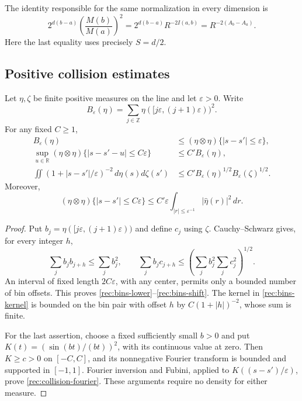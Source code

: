 The identity responsible for the same normalization in every dimension is
\begin{equation}\label{rec:normalization}
 2^{d(b-a)}\left(\frac{M(b)}{M(a)}\right)^2
 =2^{d(b-a)}R^{-2I(a,b)}
 =R^{-2(A_b-A_a)}.
\end{equation}
Here the last equality uses precisely $S=d/2$.

\subsection{Positive collision estimates}

\begin{lemma}\label{rec:binning}
Let \(\eta,\zeta\) be finite positive measures on the line and let
\(\varepsilon>0\).  Write
\[
 B_\varepsilon(\eta)
 =\sum_{j\in\mathbb Z}\eta([j\varepsilon,(j+1)\varepsilon))^2.
\]
For any fixed \(C\ge1\),
\begin{align}
 B_\varepsilon(\eta)
 &\le(\eta\otimes\eta)\{|s-s'|\le\varepsilon\},
 \label{rec:bins-lower}\\
 \sup_{u\in\mathbb R}
 (\eta\otimes\eta)\{|s-s'-u|\le C\varepsilon\}
 &\le C' B_\varepsilon(\eta),
 \label{rec:bins-shift}\\
 \iint(1+|s-s'|/\varepsilon)^{-2}\,d\eta(s)d\zeta(s')
 &\le C' B_\varepsilon(\eta)^{1/2}
                    B_\varepsilon(\zeta)^{1/2}.
 \label{rec:bins-kernel}
\end{align}
Moreover,
\begin{equation}\label{rec:collision-fourier}
 (\eta\otimes\eta)\{|s-s'|\le C\varepsilon\}
 \le C'\varepsilon
       \int_{|r|\le\varepsilon^{-1}}|\widehat\eta(r)|^2\,dr.
\end{equation}
\end{lemma}

\begin{proof}
Put \(b_j=\eta([j\varepsilon,(j+1)\varepsilon))\) and define \(c_j\)
using \(\zeta\).  Cauchy--Schwarz gives, for every integer \(h\),
\[
 \sum_jb_jb_{j+h}\le\sum_jb_j^2,
 \qquad
 \sum_jb_jc_{j+h}\le
       \left(\sum_jb_j^2\sum_jc_j^2\right)^{1/2}.
\]
An interval of fixed length \(2C\varepsilon\), with any center, permits
only a bounded number of bin offsets.  This proves
\eqref{rec:bins-lower}--\eqref{rec:bins-shift}.  The kernel in
\eqref{rec:bins-kernel} is bounded on the bin pair with offset \(h\) by
\(C(1+|h|)^{-2}\), whose sum is finite.

For the last assertion, choose a fixed sufficiently small \(b>0\) and
put \(K(t)=(\sin(bt)/(bt))^2\), with its continuous value at zero.
Then \(K\ge c>0\) on \([-C,C]\), and its nonnegative Fourier transform
is bounded and supported in \([-1,1]\).  Fourier inversion and Fubini,
applied to \(K((s-s')/\varepsilon)\), prove
\eqref{rec:collision-fourier}.  These arguments require no density for
either measure.
\end{proof}


